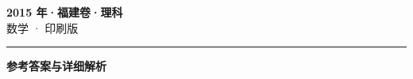 \documentclass[zihao=5, a4paper]{ctexart}
\begin{document}
\begin{center}
  {\Large\bfseries 2015 年·福建卷·理科}\\[4pt]
  {\large 数学 · 印刷版}
\end{center}
\medskip
{}

\par\bigskip\hrule\bigskip
{}
\begin{center}{\large\bfseries 参考答案与详细解析}\end{center}
\smallskip

\end{document}
